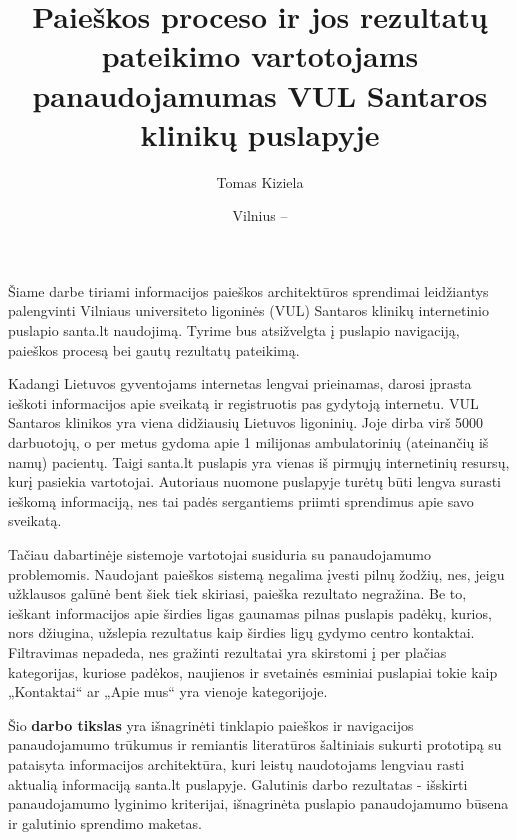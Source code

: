 \documentclass{VUMIFPSkursinis}
\title{Paieškos proceso ir jos rezultatų pateikimo vartotojams panaudojamumas VUL Santaros klinikų puslapyje}
\author{Tomas Kiziela}
\date{Vilnius – \the\year}
\begin{document}
	
\maketitle
\cleardoublepage{}
\setcounter{page}{2}

\tableofcontents



Šiame darbe tiriami informacijos paieškos architektūros sprendimai leidžiantys palengvinti Vilniaus universiteto ligoninės (VUL) Santaros klinikų internetinio puslapio santa.lt naudojimą. Tyrime bus atsižvelgta į puslapio navigaciją, paieškos procesą bei gautų rezultatų pateikimą.

Kadangi Lietuvos gyventojams internetas lengvai prieinamas, darosi įprasta ieškoti informacijos apie sveikatą ir registruotis pas gydytoją internetu\cite{InternetUseByPublicSAEn}\cite{InternetUseByPublicHKEn}. VUL Santaros klinikos yra viena didžiausių Lietuvos ligoninių. Joje dirba virš 5000 darbuotojų, o per metus gydoma apie 1 milijonas ambulatorinių (ateinančių iš namų) pacientų\cite{VulSkApieMusLt}. Taigi santa.lt puslapis yra vienas iš pirmųjų internetinių resursų, kurį pasiekia vartotojai. Autoriaus nuomone puslapyje turėtų būti lengva surasti ieškomą informaciją, nes tai padės sergantiems priimti sprendimus apie savo sveikatą.

Tačiau dabartinėje sistemoje vartotojai susiduria su panaudojamumo problemomis. Naudojant paieškos sistemą negalima įvesti pilnų žodžių, nes, jeigu užklausos galūnė bent šiek tiek skiriasi, paieška rezultato negražina. Be to, ieškant informacijos apie širdies ligas gaunamas pilnas puslapis padėkų, kurios, nors džiugina, užslepia rezultatus kaip širdies ligų gydymo centro kontaktai. Filtravimas nepadeda, nes gražinti rezultatai yra skirstomi į per plačias kategorijas, kuriose padėkos, naujienos ir svetainės esminiai puslapiai tokie kaip „Kontaktai“ ar „Apie mus“ yra vienoje kategorijoje. 

Šio \textbf{darbo tikslas} yra išnagrinėti tinklapio paieškos ir navigacijos panaudojamumo trūkumus ir remiantis literatūros šaltiniais sukurti prototipą su pataisyta informacijos architektūra, kuri leistų naudotojams lengviau rasti aktualią informaciją santa.lt puslapyje. Galutinis darbo rezultatas - išskirti panaudojamumo lyginimo kriterijai, išnagrinėta puslapio panaudojamumo būsena ir galutinio sprendimo maketas.
\end{document}
